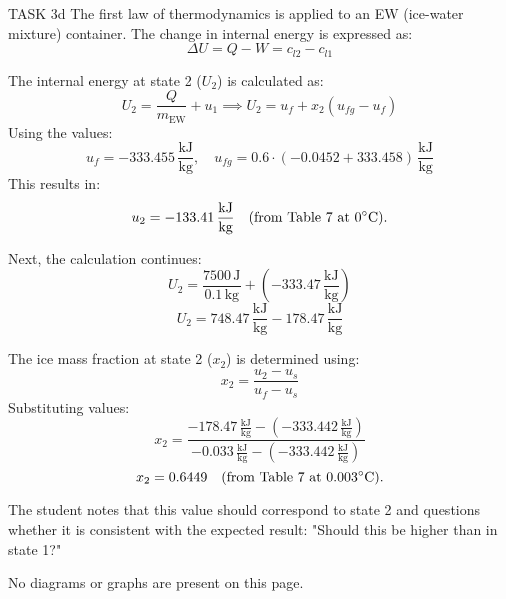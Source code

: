 TASK 3d  
The first law of thermodynamics is applied to an EW (ice-water mixture) container. The change in internal energy is expressed as:  
\[
\Delta U = Q - W = c_{l2} - c_{l1}
\]

The internal energy at state 2 (\( U_2 \)) is calculated as:  
\[
U_2 = \frac{Q}{m_{\text{EW}}} + u_1 \implies U_2 = u_f + x_2 (u_{fg} - u_f)
\]  
Using the values:  
\[
u_f = -333.455 \, \frac{\text{kJ}}{\text{kg}}, \quad u_{fg} = 0.6 \cdot (-0.0452 + 333.458) \, \frac{\text{kJ}}{\text{kg}}
\]  
This results in:  
\[
u_2 = -133.41 \, \frac{\text{kJ}}{\text{kg}} \quad \text{(from Table 7 at \( 0^\circ\text{C} \))}.
\]

Next, the calculation continues:  
\[
U_2 = \frac{7500 \, \text{J}}{0.1 \, \text{kg}} + (-333.47 \, \frac{\text{kJ}}{\text{kg}})
\]  
\[
U_2 = 748.47 \, \frac{\text{kJ}}{\text{kg}} - 178.47 \, \frac{\text{kJ}}{\text{kg}}
\]

The ice mass fraction at state 2 (\( x_2 \)) is determined using:  
\[
x_2 = \frac{u_2 - u_s}{u_f - u_s}
\]  
Substituting values:  
\[
x_2 = \frac{-178.47 \, \frac{\text{kJ}}{\text{kg}} - (-333.442 \, \frac{\text{kJ}}{\text{kg}})}{-0.033 \, \frac{\text{kJ}}{\text{kg}} - (-333.442 \, \frac{\text{kJ}}{\text{kg}})}
\]  
\[
x_2 = 0.6449 \quad \text{(from Table 7 at \( 0.003^\circ\text{C} \))}.
\]

The student notes that this value should correspond to state 2 and questions whether it is consistent with the expected result:  
"Should this be higher than in state 1?"  

No diagrams or graphs are present on this page.